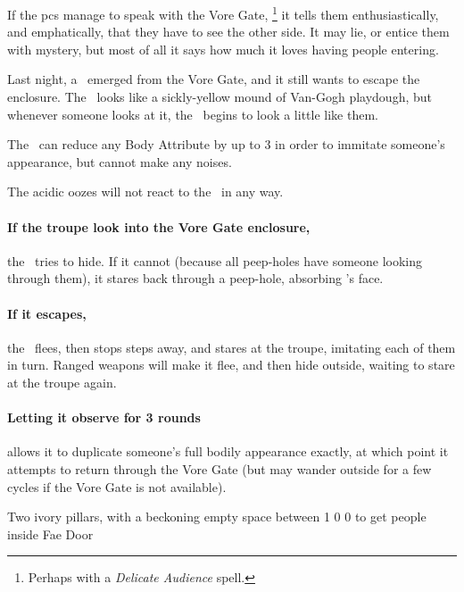 \begin{multicols}{2}
If the \glspl{pc} manage to speak with the Vore Gate,%
\footnote{Perhaps with a \textit{Delicate Audience} spell.}
it tells them enthusiastically, and emphatically, that they have to see the other side.
It may lie, or entice them with mystery, but most of all it says how much it loves having people entering.

\setcounter{statDots}{0}
Last night, a \superWierdzi\ emerged from the Vore Gate, and it still wants to escape the enclosure.
The \superWierdzi\ looks like a sickly-yellow mound of Van-Gogh playdough, but whenever someone looks at it, the \superWierdzi\ begins to look a little like them.

\mphlg

The \superWierdzi\ can reduce any Body Attribute by up to 3 in order to immitate someone's appearance, but cannot make any noises.

The acidic oozes will not react to the \superWierdzi\ in any way.

\paragraph{If the troupe look into the Vore Gate enclosure,}
the \superWierdzi\ tries to hide.
If it cannot (because all peep-holes have someone looking through them), it stares back through a peep-hole, absorbing 's face.

\paragraph{If it escapes,}
the \superWierdzi\ flees, then stops steps away, and stares at the troupe, imitating each of them in turn.
Ranged weapons will make it flee, and then hide outside, waiting to stare at the troupe again.

\paragraph{Letting it observe for 3 rounds}
allows it to duplicate someone's full bodily appearance exactly, at which point it attempts to return through the Vore Gate (but may wander outside for a few \glspl{cycle} if the Vore Gate is not available).

  {Two ivory pillars, with a beckoning empty space between}%
  {1}%
  {0}%
  {0}%
  {to get people inside}%
  {Fae Door}%
  {
    \setcounter{Fire}{3}
    \setcounter{Earth}{2}
    \setcounter{Fate}{1}
    \setcounter{Water}{1}
    \setcounter{Academics}{2}
    \setcounter{Wyldcrafting}{1}
  }%


\end{multicols}
